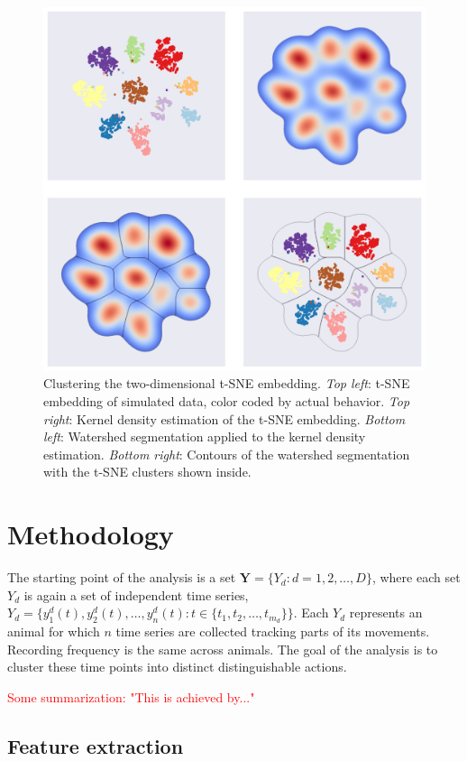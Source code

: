 \documentclass[a4paper, 10pt]{memoir}
\theoremstyle{plain}
\theoremstyle{definition}
\theoremstyle{remark}
\begin{document}
\begin{figure}[tb]
        \centering
        \includegraphics[width=0.8\linewidth]{./code/figures/clustering_example.pdf}
        \caption{Clustering the two-dimensional t-SNE embedding. \textit{Top left}: t-SNE embedding of simulated data, color coded by actual behavior. 
        \textit{Top right}: Kernel density estimation of the t-SNE embedding.
\textit{Bottom left}: Watershed segmentation applied to the kernel density estimation.
\textit{Bottom right}: Contours of the watershed segmentation with the t-SNE clusters shown inside.}
        \label{fig:clustering_example}
\end{figure}





\chapter{Methodology}
The starting point of the analysis is a set $\textbf{Y} =  \{ Y_d : d = 1, 2, \hdots, D \}$, where each set $Y_d$ is again a set of independent time series, $Y_d = \{ y_1^d(t), y_2^d(t), \hdots, y_n^d(t): t \in \{t_1, t_2, \hdots, t_{m_d} \} \}$.
Each $Y_d$ represents an animal for which $n$ time series are collected tracking parts of its movements.
Recording frequency is the same across animals.
The goal of the analysis is to cluster these time points into distinct distinguishable actions.

\textcolor{red}{Some summarization: "This is achieved by..."}

\section{Feature extraction}
\end{document}
